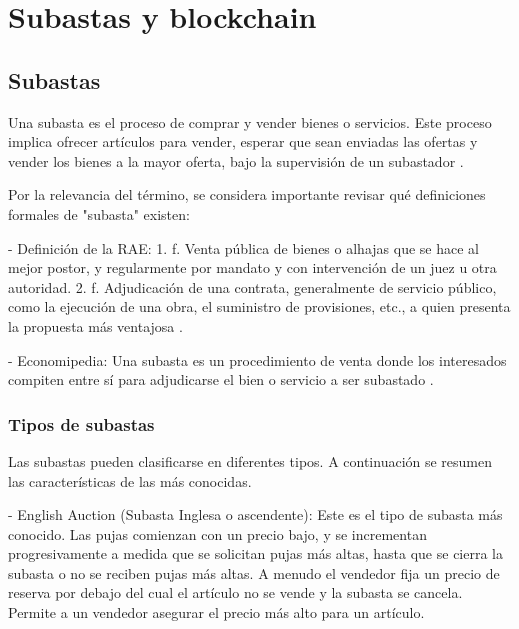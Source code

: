 \chapter{Subastas y blockchain}\label{chapter:chapter1}

\hspace*{}

\section{Subastas}
  
  \hspace*{}

  Una subasta es el proceso de comprar y vender bienes o servicios. Este proceso implica ofrecer artículos 
  para vender, esperar que sean enviadas las ofertas y vender los bienes a la mayor oferta, bajo la supervisión
  de un subastador \parencite{krishna}.


  Por la relevancia del término, se considera importante revisar qué definiciones formales de "subasta" existen:

  - Definición de la RAE: %
  1. f. Venta pública de bienes o alhajas que se hace al mejor postor, y regularmente por mandato y con intervención de un juez u otra 
  autoridad.
  2. f. Adjudicación de una contrata, generalmente de servicio público, como la ejecución de una obra, el suministro de provisiones, etc., 
  a quien presenta la propuesta más ventajosa \parencite{raesubasta}.

  - Economipedia:
  Una subasta es un procedimiento de venta donde los interesados compiten entre sí para adjudicarse el bien o servicio a ser subastado 
  \parencite{economipediasubasta}.

  \subsection{Tipos de subastas} \hspace*{}

    Las subastas pueden clasificarse en diferentes tipos. A continuación se resumen las características de las más conocidas.

    - English Auction (Subasta Inglesa o ascendente): Este es el tipo de subasta más conocido. Las pujas comienzan con un precio bajo, y se 
    incrementan progresivamente a medida que se solicitan pujas más altas, hasta que se cierra la subasta o 
    no se reciben pujas más altas. A menudo el vendedor fija un precio de reserva por debajo del cual el 
    artículo no se vende y la subasta se cancela. Permite a un vendedor asegurar el precio más alto para un 
    artículo.

